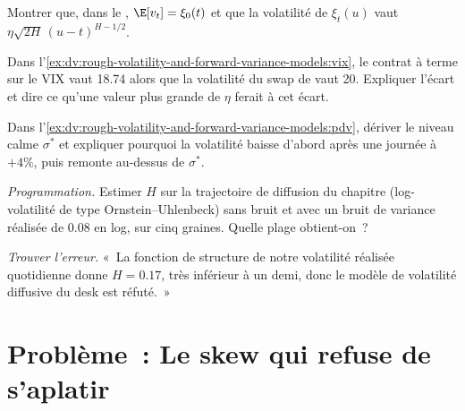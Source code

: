 \begin{exercise}[$\star\star$]\label{exo:dv:rough-volatility-and-forward-variance-models:4}
Montrer que, dans le , $\E[v_t]=\xi_0(t)$ et que la volatilité de $\xi_t(u)$ vaut
$\eta\sqrt{2H}\,(u-t)^{H-1/2}$.
\end{exercise}

\begin{exercise}[$\star\star$]\label{exo:dv:rough-volatility-and-forward-variance-models:5}
Dans l'\cref{ex:dv:rough-volatility-and-forward-variance-models:vix}, le contrat à terme sur le VIX vaut 18.74 alors que la volatilité du
swap de  vaut 20. Expliquer l'écart et dire ce qu'une valeur plus grande de $\eta$ ferait à cet écart.
\end{exercise}

\begin{exercise}[$\star\star$]\label{exo:dv:rough-volatility-and-forward-variance-models:6}
Dans l'\cref{ex:dv:rough-volatility-and-forward-variance-models:pdv}, dériver le niveau calme $\sigma^*$ et expliquer pourquoi
la volatilité baisse d'abord après une journée à $+4\%$, puis remonte au-dessus de $\sigma^*$.
\end{exercise}

\begin{exercise}[$\star\star\star$]\label{exo:dv:rough-volatility-and-forward-variance-models:7}
\emph{Programmation.} Estimer $H$ sur la trajectoire de diffusion du chapitre (log-volatilité de type Ornstein--Uhlenbeck) sans bruit et
avec un bruit de variance réalisée de 0.08 en log, sur cinq graines. Quelle plage obtient-on~?
\end{exercise}

\begin{exercise}[$\star\star\star$]\label{exo:dv:rough-volatility-and-forward-variance-models:8}
\emph{Trouver l'erreur.} «~La fonction de structure de notre volatilité réalisée quotidienne donne $H=0.17$, très inférieur à un demi,
donc le modèle de volatilité diffusive du desk est réfuté.~»
\end{exercise}

\section{Problème~: Le skew qui refuse de s'aplatir}

